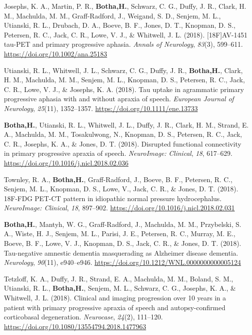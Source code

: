 \documentclass[11pt, a4paper]{awesome-cv}
\begin{document}
\leavevmode\hypertarget{ref-josephs_18fav-1451_2018}{}%
Josephs, K. A., Martin, P. R., \textbf{Botha,H.}, Schwarz, C. G., Duffy,
J. R., Clark, H. M., Machulda, M. M., Graff-Radford, J., Weigand, S. D.,
Senjem, M. L., Utianski, R. L., Drubach, D. A., Boeve, B. F., Jones, D.
T., Knopman, D. S., Petersen, R. C., Jack, C. R., Lowe, V. J., \&
Whitwell, J. L. (2018). {[}{18F}{]}{AV}-1451 tau-{PET} and primary
progressive aphasia. \emph{Annals of Neurology}, \emph{83}(3), 599--611.
\url{https://doi.org/10.1002/ana.25183}

\leavevmode\hypertarget{ref-utianski_tau_2018}{}%
Utianski, R. L., Whitwell, J. L., Schwarz, C. G., Duffy, J. R.,
\textbf{Botha,H.}, Clark, H. M., Machulda, M. M., Senjem, M. L.,
Knopman, D. S., Petersen, R. C., Jack, C. R., Lowe, V. J., \& Josephs,
K. A. (2018). Tau uptake in agrammatic primary progressive aphasia with
and without apraxia of speech. \emph{European Journal of Neurology},
\emph{25}(11), 1352--1357. \url{https://doi.org/10.1111/ene.13733}

\leavevmode\hypertarget{ref-botha_disrupted_2018}{}%
\textbf{Botha,H.}, Utianski, R. L., Whitwell, J. L., Duffy, J. R.,
Clark, H. M., Strand, E. A., Machulda, M. M., Tosakulwong, N., Knopman,
D. S., Petersen, R. C., Jack, C. R., Josephs, K. A., \& Jones, D. T.
(2018). Disrupted functional connectivity in primary progressive apraxia
of speech. \emph{NeuroImage: Clinical}, \emph{18}, 617--629.
\url{https://doi.org/10.1016/j.nicl.2018.02.036}

\leavevmode\hypertarget{ref-townley_18f-fdg_2018}{}%
Townley, R. A., \textbf{Botha,H.}, Graff-Radford, J., Boeve, B. F.,
Petersen, R. C., Senjem, M. L., Knopman, D. S., Lowe, V., Jack, C. R.,
\& Jones, D. T. (2018). {18F}-{FDG} {PET}-{CT} pattern in idiopathic
normal pressure hydrocephalus. \emph{NeuroImage: Clinical}, \emph{18},
897--902. \url{https://doi.org/10.1016/j.nicl.2018.02.031}

\leavevmode\hypertarget{ref-botha_tau-negative_2018}{}%
\textbf{Botha,H.}, Mantyh, W. G., Graff-Radford, J., Machulda, M. M.,
Przybelski, S. A., Wiste, H. J., Senjem, M. L., Parisi, J. E., Petersen,
R. C., Murray, M. E., Boeve, B. F., Lowe, V. J., Knopman, D. S., Jack,
C. R., \& Jones, D. T. (2018). Tau-negative amnestic dementia
masquerading as {Alzheimer} disease dementia. \emph{Neurology},
\emph{90}(11), e940--e946.
\url{https://doi.org/10.1212/WNL.0000000000005124}

\leavevmode\hypertarget{ref-tetzloff_clinical_2018}{}%
Tetzloff, K. A., Duffy, J. R., Strand, E. A., Machulda, M. M., Boland,
S. M., Utianski, R. L., \textbf{Botha,H.}, Senjem, M. L., Schwarz, C.
G., Josephs, K. A., \& Whitwell, J. L. (2018). Clinical and imaging
progression over 10 years in a patient with primary progressive apraxia
of speech and autopsy-confirmed corticobasal degeneration.
\emph{Neurocase}, \emph{24}(2), 111--120.
\url{https://doi.org/10.1080/13554794.2018.1477963}
\end{document}
